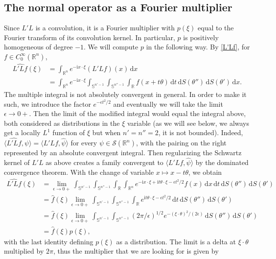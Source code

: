 \documentclass[11pt]{amsart}
\theoremstyle{definition}
\theoremstyle{remark}
\numberwithin{equation}{section}
\newcommand{\rb}{\mathbb{R}}
\renewcommand{\d}{\,\mathrm{d}}
\renewcommand{\sb}{\mathbb{S}}
\newcommand{\I}{\mathrm{i}}
\begin{document}
\subsection{The normal operator as a Fourier multiplier} 
Since $L'L$ is a convolution, it is a  Fourier multiplier with $p(\xi)$ equal to the Fourier transform of its convolution kernel. In particular, $p$ is positively homogeneous of degree $-1$. We will compute $p$ in the following way. 
By \eqref{L'Lf}, for $f\in C_0^\infty(\rb^n)$,  
\begin{align*}
    \widehat{L'L f}(\xi) &= \int_{\rb^{n}} e^{-\I x \cdot \xi} (L'L f)(x) \d x \\
    &=  \int_{\rb^{n}} e^{-\I x \cdot \xi} \int_{\sb^{n'-1}} \int_{\sb^{n''-1}} \int_{\rb} f\left ( x + t \theta \right) \d  t \d S(\theta'') \d S(\theta') \d x.
\end{align*}
The multiple integral is not absolutely convergent in general. In order to make it such, we introduce the factor $e^{-\epsilon t^2/2}$ and eventually we will take the limit $\epsilon\to 0+$. Then the limit of the modified integral would equal the integral above, both considered as distributions in the $\xi$ variable (as we will see below, we always get a locally $L^1$ function of $\xi$ but when $n'=n''=2$, it is not bounded).  Indeed, $\langle \widehat{L'L f},\psi\rangle = \langle L'Lf,\hat\psi\rangle $ for every $\psi\in\mathcal{S}(\rb^n)$, with the pairing on the right represented by an absolute convergent integral. Then regularizing the Schwartz kernel of $L'L$ as above creates a family convergent  to $\langle L'Lf,\hat\psi\rangle $ by the dominated convergence theorem.   
  With the change of variable $x \mapsto x-t\theta$, we obtain
\begin{align*}
    \widehat{L'L f}(\xi) &= \lim_{\epsilon\to 0+} \int_{\sb^{n'-1}} \int_{\sb^{n''-1}} \int_{\rb} \int_{\rb^{n}} e^{-\I x \cdot \xi + \I  t\theta \cdot \xi -\epsilon t^2/2} f(x) \d x \d t \d S(\theta'') \d S(\theta') \\
    &=  \widehat{f}(\xi)\lim_{\epsilon\to 0+}  \int_{\sb^{n'-1}} \int_{\sb^{n''-1}} \int_{\rb} e^{ \I  t\theta \cdot \xi -\epsilon t^2/2 } \d t \d S(\theta'') \d S(\theta')\\
    &=  \widehat{f}(\xi)\lim_{\epsilon\to 0+}  \int_{\sb^{n'-1}} \int_{\sb^{n''-1}}  
    (2\pi/\epsilon)^{1/2} e^{ - (\xi \cdot\theta)^2/(2\epsilon) }   \d S(\theta'') \d S(\theta')\\
    & = \hat f(\xi) p(\xi),
\end{align*}
with the last identity defining $p(\xi)$ as a distribution. The limit is a delta at $\xi\cdot\theta$ multiplied by $2\pi$, thus the multiplier that we are looking for is given by
\end{document}

